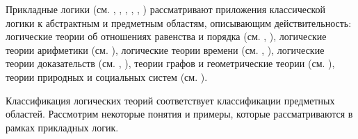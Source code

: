 Прикладные логики (см. , , , , , ) рассматривают приложения классической логики к абстрактным и предметным областям, описывающим действительность: логические теории об отношениях равенства и порядка (см. , ), логические теории арифметики (см. ), логические теории времени (см. , ), логические теории доказательств (см. , ), теории графов и геометрические теории (см. ), теории природных и социальных систем (см. ).

Классификация логических теорий соответствует классификации предметных областей.
Рассмотрим некоторые понятия и примеры, которые рассматриваются в рамках прикладных логик.

